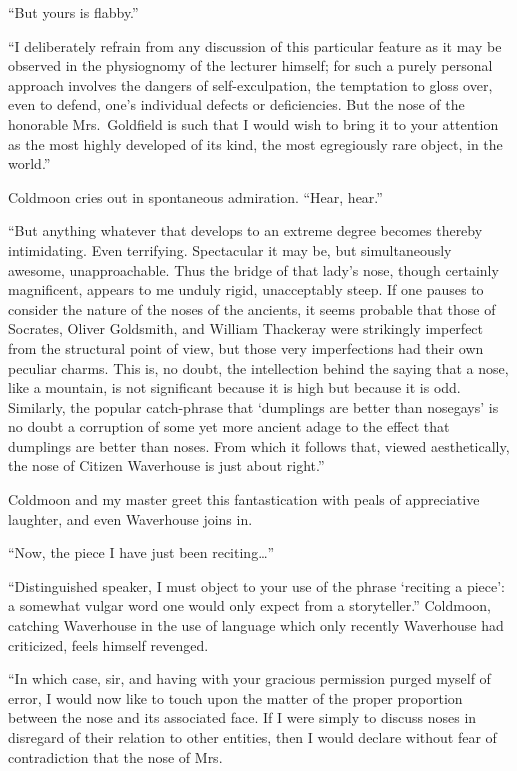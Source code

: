 \documentclass[12pt, openright]{book}
\begin{document}
``But yours is flabby.''

``I deliberately refrain from any discussion of this particular feature
as it may be observed in the physiognomy of the lecturer himself; for
such a purely personal approach involves the dangers of
self-exculpation, the temptation to gloss over, even to defend, one's
individual defects or deficiencies. But the nose of the honorable
Mrs.~Goldfield is such that I would wish to bring it to your attention
as the most highly developed of its kind, the most egregiously rare
object, in the world.''

Coldmoon cries out in spontaneous admiration. ``Hear, hear.''

``But anything whatever that develops to an extreme degree becomes
thereby intimidating. Even terrifying. Spectacular it may be, but
simultaneously awesome, unapproachable. Thus the bridge of that lady's
nose, though certainly magnificent, appears to me unduly rigid,
unacceptably steep. If one pauses to consider the nature of the noses of
the ancients, it seems probable that those of Socrates, Oliver
Goldsmith, and William Thackeray were strikingly imperfect from the
structural point of view, but those very imperfections had their own
peculiar charms. This is, no doubt, the intellection behind the saying
that a nose, like a mountain, is not significant because it is high but
because it is odd. Similarly, the popular catch-phrase that `dumplings
are better than nosegays' is no doubt a corruption of some yet more
ancient adage to the effect that dumplings are better than noses. From
which it follows that, viewed aesthetically, the nose of Citizen
Waverhouse is just about right.''

Coldmoon and my master greet this fantastication with peals of
appreciative laughter, and even Waverhouse joins in.

``Now, the piece I have just been reciting\ldots{}''

``Distinguished speaker, I must object to your use of the phrase
`reciting a piece': a somewhat vulgar word one would only expect from a
storyteller.'' Coldmoon, catching Waverhouse in the use of language
which only recently Waverhouse had criticized, feels himself revenged.

``In which case, sir, and having with your gracious permission purged
myself of error, I would now like to touch upon the matter of the proper
proportion between the nose and its associated face. If I were simply to
discuss noses in disregard of their relation to other entities, then I
would declare without fear of contradiction that the nose of Mrs.
\end{document}
